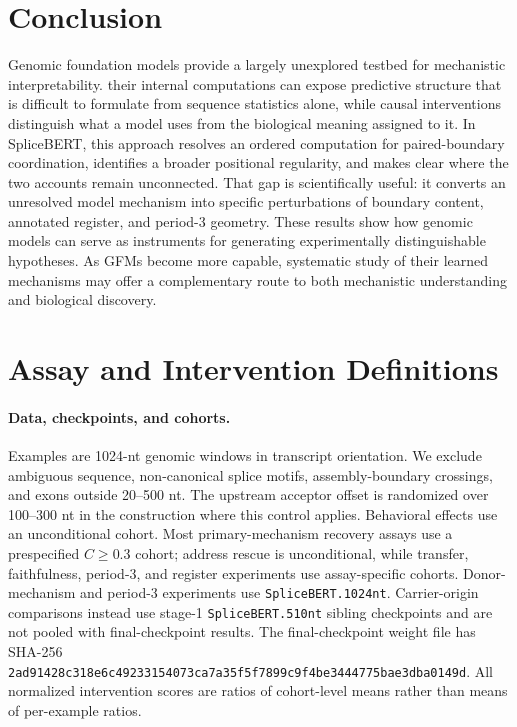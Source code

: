\documentclass{article}
\begin{document}
\section{Conclusion}
\label{sec:Conclusion}
Genomic foundation models provide a largely unexplored testbed for mechanistic interpretability. their internal computations can expose predictive structure that is difficult to formulate from sequence statistics alone, while causal interventions distinguish what a model uses from the biological meaning assigned to it. In SpliceBERT, this approach resolves an ordered computation for paired-boundary coordination, identifies a broader positional regularity, and makes clear where the two accounts remain unconnected. That gap is scientifically useful: it converts an unresolved model mechanism into specific perturbations of boundary content, annotated register, and period-3 geometry. These results show how genomic models can serve as instruments for generating experimentally distinguishable hypotheses. As GFMs become more capable, systematic study of their learned mechanisms may offer a complementary route to both mechanistic understanding and biological discovery.

\clearpage



\appendix

\section{Assay and Intervention Definitions}
\label{app:methods}

\paragraph{Data, checkpoints, and cohorts.}
Examples are 1024-nt genomic windows in transcript orientation. We exclude ambiguous sequence, non-canonical splice motifs, assembly-boundary crossings, and exons outside 20--500 nt. The upstream acceptor offset is randomized over 100--300 nt in the construction where this control applies. Behavioral effects use an unconditional cohort. Most primary-mechanism recovery assays use a prespecified \(C\geq0.3\) cohort; address rescue is unconditional, while transfer, faithfulness, period-3, and register experiments use assay-specific cohorts. Donor-mechanism and period-3 experiments use \texttt{SpliceBERT.1024nt}. Carrier-origin comparisons instead use stage-1 \texttt{SpliceBERT.510nt} sibling checkpoints and are not pooled with final-checkpoint results. The final-checkpoint weight file has SHA-256 \texttt{2ad91428c318e6c49233154073ca7a35f5f7899c9f4be3444775bae3dba0149d}. All normalized intervention scores are ratios of cohort-level means rather than means of per-example ratios.
\end{document}
